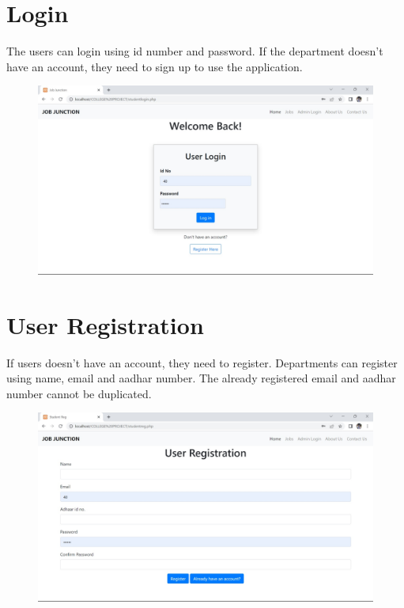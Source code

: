 \documentclass[a4paper,11pt]{report}
\begin{document}
\section{Login}
The users can login using id number and password.
If the department doesn't have an account, they need to sign up to use the application. 
\begin{figure}[h]
	\centering
	\hspace{21pt}
	\includegraphics[width=.70\linewidth]{job5.jpeg}
	\label{fig:job5.jpeg}
\end{figure}

\section{User Registration}
If users doesn't have an account, they need to register. Departments can register using name, email and aadhar number. The already registered email and aadhar number cannot be duplicated.
\begin{figure}[h]
	\centering
	\hspace{21pt}
	\includegraphics[width=.70\linewidth]{job4.jpeg}
	\label{fig:job4.jpeg}
\end{figure}
\end{document}
